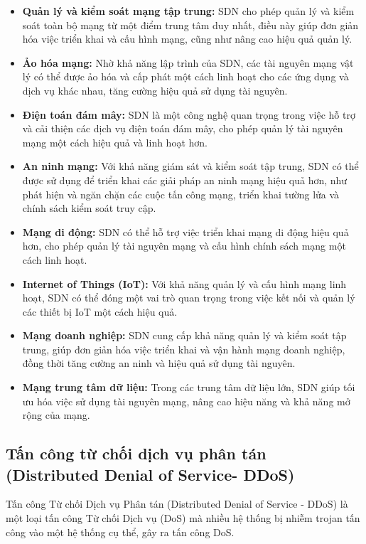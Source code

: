 \documentclass[a4paper]{article}
\begin{document}
\begin{itemize}
    \item \textbf{Quản lý và kiểm soát mạng tập trung: }SDN cho phép quản lý và kiểm soát toàn bộ mạng từ một điểm trung tâm duy nhất, điều này giúp đơn giản hóa việc triển khai và cấu hình mạng, cũng như nâng cao hiệu quả quản lý.
    \item \textbf{Ảo hóa mạng: }Nhờ khả năng lập trình của SDN, các tài nguyên mạng vật lý có thể được ảo hóa và cấp phát một cách linh hoạt cho các ứng dụng và dịch vụ khác nhau, tăng cường hiệu quả sử dụng tài nguyên.
    \item \textbf{Điện toán đám mây: }SDN là một công nghệ quan trọng trong việc hỗ trợ và cải thiện các dịch vụ điện toán đám mây, cho phép quản lý tài nguyên mạng một cách hiệu quả và linh hoạt hơn.
    \item \textbf{An ninh mạng: }Với khả năng giám sát và kiểm soát tập trung, SDN có thể được sử dụng để triển khai các giải pháp an ninh mạng hiệu quả hơn, như phát hiện và ngăn chặn các cuộc tấn công mạng, triển khai tường lửa và chính sách kiểm soát truy cập.
    \item \textbf{Mạng di động: }SDN có thể hỗ trợ việc triển khai mạng di động hiệu quả hơn, cho phép quản lý tài nguyên mạng và cấu hình chính sách mạng một cách linh hoạt.
    \item \textbf{Internet of Things (IoT): }Với khả năng quản lý và cấu hình mạng linh hoạt, SDN có thể đóng một vai trò quan trọng trong việc kết nối và quản lý các thiết bị IoT một cách hiệu quả.
    \item \textbf{Mạng doanh nghiệp: }SDN cung cấp khả năng quản lý và kiểm soát tập trung, giúp đơn giản hóa việc triển khai và vận hành mạng doanh nghiệp, đồng thời tăng cường an ninh và hiệu quả sử dụng tài nguyên.
    \item \textbf{Mạng trung tâm dữ liệu: }Trong các trung tâm dữ liệu lớn, SDN giúp tối ưu hóa việc sử dụng tài nguyên mạng, nâng cao hiệu năng và khả năng mở rộng của mạng.
\end{itemize}

\subsection{Tấn công từ chối dịch vụ phân tán (Distributed Denial of Service- DDoS)}
Tấn công Từ chối Dịch vụ Phân tán (Distributed Denial of Service - DDoS) là một loại tấn công Từ chối Dịch vụ (DoS) mà nhiều hệ thống bị nhiễm trojan tấn công vào một hệ thống cụ thể, gây ra tấn công DoS.
\end{document}
